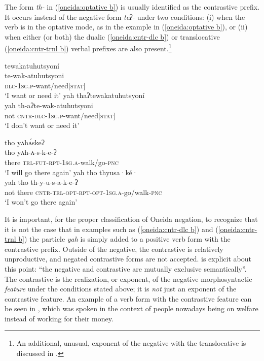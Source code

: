 \documentclass[output=paper,colorlinks,citecolor=brown]{langscibook}
\begin{document}
The form \textit{th-} in (\ref{oneida:optative b}) is usually identified as the contrastive prefix. It occurs instead of the negative form \textit{teʔ-} under two conditions: (i) when the verb is in the optative mode, as in the example in (\ref{oneida:optative b}), or (ii) when either (or both) the dualic (\ref{oneida:cntr-dlc b}) or translocative (\ref{oneida:cntr-trnl b}) verbal prefixes are also present.\footnote{An additional, unusual, exponent of the negative with the translocative is discussed in .}

\ea\label{oneida:cntr-dlc}
    \ea\label{oneida:cntr-dlc a}
        \glll tewakatuhutsyoní \\
        te-wak-atuhutsyoni \\
        \textsc{dlc-1sg.p}-want/need[\textsc{stat}] \\
        \glt `I want or need it' \citep[254]{MichelsonDoxtator2002}
    \ex\label{oneida:cntr-dlc b}
        \glll yah thaʔtewakatuhutsyoní \\
        yah th-aʔte-wak-atuhutsyoni  \\
        not \textsc{cntr-dlc-1sg.p}-want/need[\textsc{stat}] \\
        \glt `I don't want or need it'	
    \z
\z 

\ea\label{oneida:cntr-trnl}
    \ea\label{oneida:cntr-trnl a}
        \glll tho yʌhʌ́skeʔ  \\
        tho yʌh-ʌ-s-k-e-ʔ  \\
        there \textsc{trl-fut-rpt-1sg.a}-walk/go-\textsc{pnc} \\
        \glt `I will go there again' \citep[295]{MichelsonDoxtator2002}
    \ex\label{oneida:cntr-trnl b}
        \glll yah tho thyusa·ké· \\
        yah tho th-y-u-s-a-k-e-ʔ \\
        not there \textsc{cntr-trl-opt-rpt-opt-1sg.a}-go/walk-\textsc{pnc} \\
        \glt `I won't go there again'	%
    \z
\z

It is important, for the proper classification of Oneida negation, to recognize that it is not the case that in examples such as (\ref{oneida:cntr-dlc b}) and (\ref{oneida:cntr-trnl b}) the particle \textit{yah} is simply added to a positive verb form with the contrastive prefix. Outside of the negative, the contrastive is relatively unproductive, and negated contrastive forms are not accepted. \citet[12]{Abbott2000} is explicit about this point: ``the negative and contrastive are mutually exclusive semantically''. The contrastive is  the realization, or exponent, of the negative morphosyntactic \textit{feature} under the conditions stated above; it is \textit{not} just an exponent of the contrastive feature. An example of a verb form with the contrastive feature can be seen in , which was spoken in the context of people nowadays being on welfare instead of working for their money.
\end{document}
